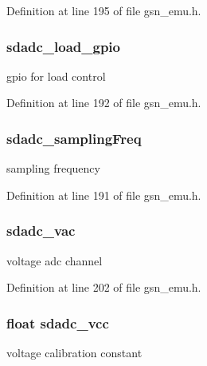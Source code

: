 Definition at line 195 of file gsn\_\-emu.h.

\hypertarget{a00058_add03215b65f178ef10b3a8683a4d1511}{
\subsubsection[{sdadc\_\-load\_\-gpio}]{ {\bf sdadc\_\-load\_\-gpio}}}
\label{a00058_add03215b65f178ef10b3a8683a4d1511}
gpio for load control 

Definition at line 192 of file gsn\_\-emu.h.

\hypertarget{a00058_a254e10a60087479de44dc5064253efac}{
\subsubsection[{sdadc\_\-samplingFreq}]{ {\bf sdadc\_\-samplingFreq}}}
\label{a00058_a254e10a60087479de44dc5064253efac}
sampling frequency 

Definition at line 191 of file gsn\_\-emu.h.

\hypertarget{a00058_adeb4fb9640ae27d76d4dbecd6dfea527}{
\subsubsection[{sdadc\_\-vac}]{ {\bf sdadc\_\-vac}}}
\label{a00058_adeb4fb9640ae27d76d4dbecd6dfea527}
voltage adc channel 

Definition at line 202 of file gsn\_\-emu.h.

\hypertarget{a00058_a53c7ccdbdaf6172d03fdd9b1a0f89f87}{
\subsubsection[{sdadc\_\-vcc}]{\setlength{\rightskip}{0pt plus 5cm}float {\bf sdadc\_\-vcc}}}
\label{a00058_a53c7ccdbdaf6172d03fdd9b1a0f89f87}
voltage calibration constant 

